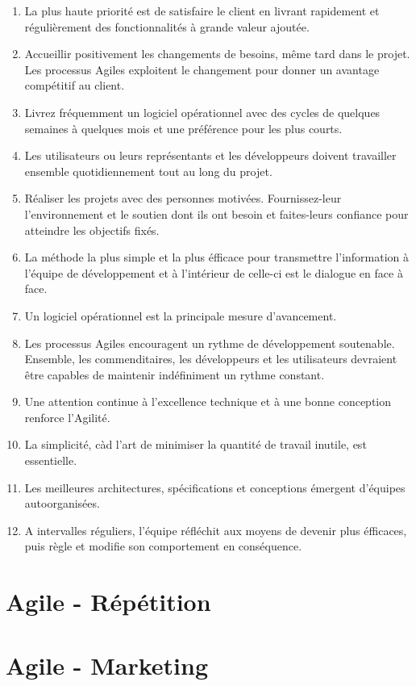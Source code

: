 \documentclass{report}
\begin{document}
		\begin{enumerate}
			\item La plus haute priorité est de satisfaire le client en livrant rapidement et régulièrement des fonctionnalités à grande valeur ajoutée.\\
			\item Accueillir positivement les changements de besoins, même tard dans le projet. Les processus Agiles exploitent le changement pour donner un avantage compétitif au client.\\
			\item Livrez fréquemment un logiciel opérationnel avec des cycles de quelques semaines à quelques mois et une préférence pour les plus courts.\\
			\item Les utilisateurs ou leurs représentants et les développeurs doivent travailler ensemble quotidiennement tout au long du projet.\\
			\item Réaliser les projets avec des personnes motivées. Fournissez-leur l'environnement et le soutien dont ils ont besoin et faites-leurs confiance pour atteindre les objectifs fixés.\\
			\item La méthode la plus simple et la plus éfficace pour transmettre l'information à l'équipe de développement et à l'intérieur de celle-ci est le dialogue en face à face.\\
			\item Un logiciel opérationnel est la principale mesure d'avancement.\\
			\item Les processus Agiles encouragent un rythme de développement soutenable. Ensemble, les commenditaires, les développeurs et les utilisateurs devraient être capables de maintenir indéfiniment un rythme constant.
			\item Une attention continue à l'excellence technique et à une bonne conception renforce l'Agilité.\\
			\item La simplicité, càd l'art de minimiser la quantité de travail inutile, est essentielle.\\
			\item Les meilleures architectures, spécifications et conceptions émergent d'équipes autoorganisées.\\
			\item A intervalles réguliers, l'équipe réfléchit aux moyens de devenir plus éfficaces, puis règle et modifie son comportement en conséquence.\\
		\end{enumerate}

	\section{Agile - Répétition}

	\section{Agile - Marketing}
\end{document}
